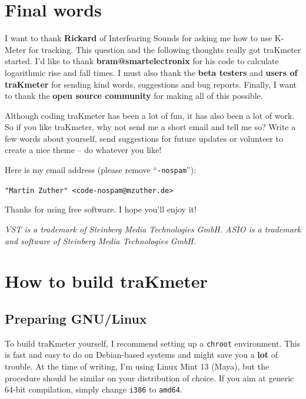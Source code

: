 
\chapter{Final words}
\label{chap:final_words}

I want to thank \textbf{Rickard} of Interfearing Sounds for asking me
how to use K-Meter for tracking.  This question and the following
thoughts really got traKmeter started.  I'd like to thank
\textbf{bram@smartelectronix} for his code to calculate logarithmic
rise and fall times.  I must also thank the \textbf{beta testers} and
\textbf{users of traKmeter} for sending kind words, suggestions and
bug reports.  Finally, I want to thank the \textbf{open source
  community} for making all of this possible.

Although coding traKmeter has been a lot of fun, it has also been a
lot of work.  So if you like traKmeter, why not send me a short email
and tell me so?  Write a few words about yourself, send suggestions
for future updates or volunteer to create a nice theme -- do whatever
you like!

Here is my email address (please remove ``\texttt{-nospam}''):

\begin{center}
  \texttt{"Martin Zuther" <code-nospam@mzuther.de>}
\end{center}

Thanks for using free software.  I hope you'll enjoy it!

\emph{VST is a trademark of Steinberg Media Technologies GmbH.  ASIO
  is a trademark and software of Steinberg Media Technologies GmbH.}

\appendix

\chapter{How to build traKmeter}
\label{chap:build_trakmeter}

\section{Preparing GNU/Linux}

To build traKmeter yourself, I recommend setting up a \texttt{chroot}
environment.  This is fast and easy to do on Debian-based systems and
might save you a \textbf{lot} of trouble.  At the time of writing, I'm
using Linux Mint 13 (Maya), but the procedure should be similar on
your distribution of choice.  If you aim at generic \num{64}-bit
compilation, simply change \texttt{i386} to \texttt{amd64}.

